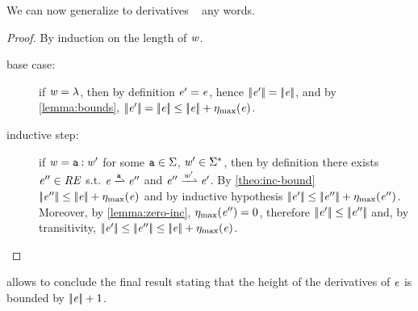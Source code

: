 We can now generalize  to derivatives \wrt~ any words.
\begin{proof}
 By induction on the length of $\word$.
 \begin{description}
  \item[base case:] if $\word=\emptyWord$, then by definition $\re'=\re$, hence
   $\tsize{\re'}=\tsize{\re}$, and by \cref{lemma:bounds}, $\tsize{\re'}=\tsize{\re}\leq\tsize{\re}+\incFunSize{\re}$.

  \item[inductive step:]
   if $\word=\sym\strcons\word'$ for some $\sym\in\symAlph$, $\word'\in\symAlph^*$, then by definition there exists $\re''\in\reSet$ s.t. $\re\parDer{\sym}\re''$ and $\re''\parDer{\word'}\re'$. By \cref{theo:inc-bound} $\tsize{\re''}\leq\tsize{\re}+\incFunSize{\re}$ and by inductive hypothesis $\tsize{\re'}\leq\tsize{\re''}+\incFunSize{\re''}$. Moreover, by \cref{lemma:zero-inc},
   $\incFunSize{\re''}=0$, therefore $\tsize{\re'}\leq\tsize{\re''}$ and, by transitivity,
   $\tsize{\re'}\leq\tsize{\re''}\leq\tsize{\re}+\incFunSize{\re}$.
 \end{description}
\end{proof}

 allows to conclude the final result stating that the height of the derivatives of $\re$ is bounded by $\tsize{\re}+1$.
